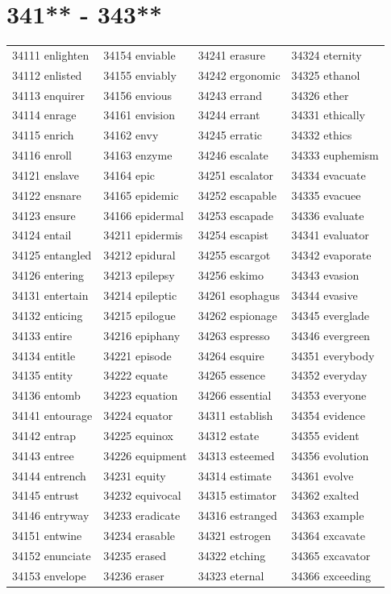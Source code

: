 \documentclass[10pt, oneside]{book}
\begin{document}
\begin{table}
	\centering
	\section*{341** - 343**}
	\begin{tabular}{l l l l}
34111 enlighten &34154 enviable &34241 erasure &34324 eternity\\
34112 enlisted &34155 enviably &34242 ergonomic &34325 ethanol\\
34113 enquirer &34156 envious &34243 errand &34326 ether\\
34114 enrage &34161 envision &34244 errant &34331 ethically\\
34115 enrich &34162 envy &34245 erratic &34332 ethics\\
34116 enroll &34163 enzyme &34246 escalate &34333 euphemism\\
34121 enslave &34164 epic &34251 escalator &34334 evacuate\\
34122 ensnare &34165 epidemic &34252 escapable &34335 evacuee\\
34123 ensure &34166 epidermal &34253 escapade &34336 evaluate\\
34124 entail &34211 epidermis &34254 escapist &34341 evaluator\\
34125 entangled &34212 epidural &34255 escargot &34342 evaporate\\
34126 entering &34213 epilepsy &34256 eskimo &34343 evasion\\
34131 entertain &34214 epileptic &34261 esophagus &34344 evasive\\
34132 enticing &34215 epilogue &34262 espionage &34345 everglade\\
34133 entire &34216 epiphany &34263 espresso &34346 evergreen\\
34134 entitle &34221 episode &34264 esquire &34351 everybody\\
34135 entity &34222 equate &34265 essence &34352 everyday\\
34136 entomb &34223 equation &34266 essential &34353 everyone\\
34141 entourage &34224 equator &34311 establish &34354 evidence\\
34142 entrap &34225 equinox &34312 estate &34355 evident\\
34143 entree &34226 equipment &34313 esteemed &34356 evolution\\
34144 entrench &34231 equity &34314 estimate &34361 evolve\\
34145 entrust &34232 equivocal &34315 estimator &34362 exalted\\
34146 entryway &34233 eradicate &34316 estranged &34363 example\\
34151 entwine &34234 erasable &34321 estrogen &34364 excavate\\
34152 enunciate &34235 erased &34322 etching &34365 excavator\\
34153 envelope &34236 eraser &34323 eternal &34366 exceeding\\
	\end{tabular}
 \end{table}
\clearpage
\end{document}
